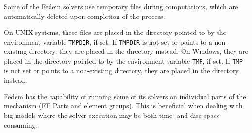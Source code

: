 {

Some of the Fedem solvers use temporary files during computations, which
are automatically deleted upon completion of the process.

On UNIX systems, these files are placed in the directory pointed to by the
environment variable {\tt TMPDIR}, if set. If {\tt TMPDIR} is not set or points
to a non-existing directory, they are placed in the directory 
instead. On Windows, they are placed in the directory pointed to by the
environment variable {\tt TMP}, if set. If {\tt TMP} is not set or points to a
non-existing directory, they are placed in the directory
 instead.




Fedem has the capability of running some of its solvers on individual
parts of the mechanism (FE Parts and element groups). This is beneficial
when dealing with big models where the solver execution may be both
time- and disc space consuming.



}
